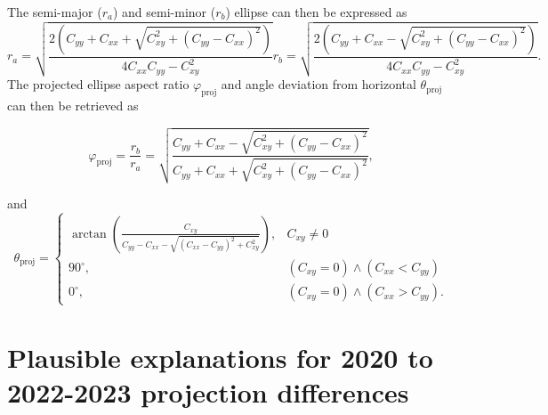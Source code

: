 \documentclass[amt, manuscript]{copernicus}
\begin{document}
The semi-major ($r_{a}$) and semi-minor ($r_{b}$) ellipse can then be expressed as
\begin{subequations}
\begin{equation}
r_{a} = \sqrt{\frac{2 \left( C_{yy} + C_{xx} + \sqrt{C_{xy}^{2} + (C_{yy}-C_{xx})^{2}}\right)}{4 C_{xx} C_{yy} - C_{xy}^{2}}}
\end{equation}
\begin{equation}
r_{b} = \sqrt{\frac{2 \left( C_{yy} + C_{xx} - \sqrt{C_{xy}^{2} + (C_{yy}-C_{xx})^{2}}\right)}{4 C_{xx} C_{yy} - C_{xy}^{2}}}.
\end{equation}
\end{subequations}
The projected ellipse aspect ratio $\varphi_{\mathrm{proj}}$ and angle deviation from horizontal $\theta_{\mathrm{proj}}$ can then be retrieved as

\begin{equation}
    \varphi_{\mathrm{proj}} = \frac{r_{b}}{r_{a}} = \sqrt{\frac{C_{yy} + C_{xx} - \sqrt{C_{xy}^{2} + (C_{yy}-C_{xx})^{2}}}{C_{yy} + C_{xx} + \sqrt{C_{xy}^{2} + (C_{yy}-C_{xx})^{2}}}},
\end{equation}

and
\begin{equation}
 \theta_{\mathrm{proj}} = 
\begin{cases}
   \arctan\left(\frac{C_{xy}}{C_{yy}-C_{xx} - \sqrt{(C_{xx}-C_{yy})^{2}+C_{xy}^{2}}}\right), & C_{xy} \neq 0\\
   90^{\circ}, & (C_{xy} =0) \land (C_{xx} < C_{yy})\\
   0^{\circ}, & (C_{xy} =0) \land (C_{xx} > C_{yy}).
\end{cases}
\end{equation}

\section{Plausible explanations for 2020 to 2022-2023 projection differences}\label{sect:discuss_King}


\end{document}
